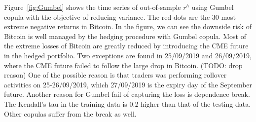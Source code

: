 Figure~\ref{fig:Gumbel} shows the time series of out-of-sample $r^h$ using Gumbel copula with the
objective of reducing variance.
The red dots are the 30 most extreme negative returns in Bitcoin.
In the figure, we can see the downside risk of Bitcoin is well managed by the hedging procedure with Gumbel copula.
Most of the extreme losses of Bitcoin are greatly reduced by introducing the CME future in the hedged portfolio.
Two exceptions are found in 25/09/2019 and 26/09/2019, where the CME future failed to follow the large drop in Bitcoin. (TODO: drop reason)
One of the possible reason is that traders was performing rollover activities on 25-26/09/2019, which
27/09/2019 is the expiry day of the September future.
Another reason for Gumbel fail of capturing the loss is dependence break.
The Kendall's tau in the training data is 0.2 higher than that of the testing data.
Other copulas suffer from the break as well.







%
%

%